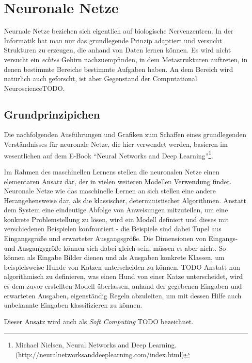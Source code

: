 \section{Neuronale Netze}

Neurnale Netze beziehen sich eigentlich auf biologische Nervenzentren. In der Informatik hat man nur das grundlegende Prinzip adaptiert und versucht Strukturen zu erzeugen, die anhand von Daten lernen können. Es wird nicht versucht ein \textit{echtes} Gehirn nachzuempfinden, in dem Metastrukturen auftreten, in denen bestimmte Bereiche bestimmte Aufgaben haben. An dem Bereich wird natürlich auch geforscht, ist aber Gegenstand der Computational NeuroscienceTODO.

\subsection*{Grundprinzipichen}

Die nachfolgenden Ausführungen und Grafiken zum Schaffen eines grundlegenden Verständnisses für neuronale Netze, die hier verwendet werden, basieren im wesentlichen auf dem E-Book ``Neural Networks and Deep Learning''\footnote{Michael Nielsen, Neural Networks and Deep Learning.\newline(http://neuralnetworksanddeeplearning.com/index.html)}.

Im Rahmen des maschinellen Lernens stellen die neuronalen Netze einen elementaren Ansatz dar, der in vielen weiteren Modellen Verwendung findet. Neuronale Netze wie das maschinelle Lernen an sich stellen eine andere Herangehensweise dar, als die klassischer, deterministischer Algorithmen. Anstatt dem System eine eindeutige Abfolge von Anweisungen mitzuteilen, um eine konkrete Problemstellung zu lösen, wird ein Modell definiert und dieses mit verschiedenen Beispielen konfrontiert - die Beispiele sind dabei Tupel aus Eingangsgröße und erwarteter Ausgangsgröße. Die Dimensionen von Eingangs- und Ausgangsgröße können sich dabei gleich sein, müssen es aber nicht. So können als Eingabe Bilder dienen und als Ausgaben konkrete Klassen, um beispielsweise Hunde von Katzen unterscheiden zu können. TODO
Anstatt nun algorithmisch zu definieren, was einen Hund von einer Katze unterscheidet, wird es dem zuvor erstellten Modell überlassen, anhand der gegebenen Eingaben und erwarteten Ausgaben, eigenständig Regeln abzuleiten, um mit dessen Hilfe auch unbekannte Eingaben klassifizieren zu können.

Dieser Ansatz wird auch als \textit{Soft Computing} TODO bezeichnet.


